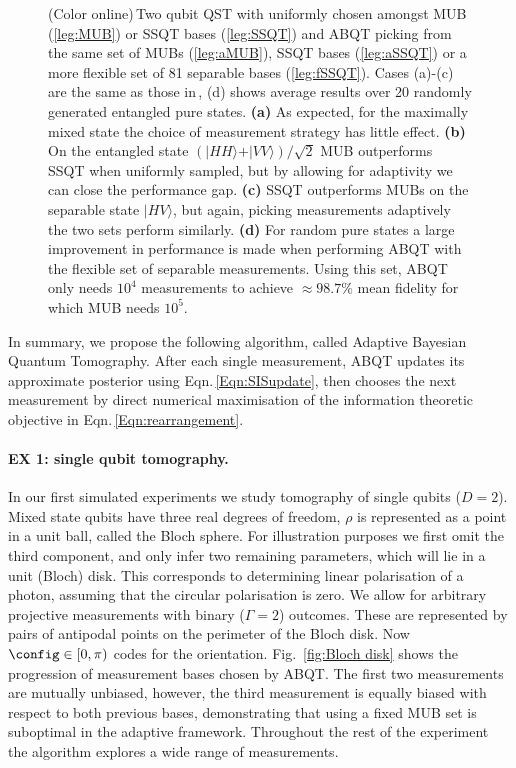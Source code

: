 \begin{figure*}[th]
\figthree
\caption{(Color online)\,Two qubit QST with uniformly chosen amongst MUB (\ref{leg:MUB}) or SSQT bases (\ref{leg:SSQT}) and ABQT picking from the same set of MUBs (\ref{leg:aMUB}),  SSQT bases (\ref{leg:aSSQT}) or a more flexible set of 81 separable bases (\ref{leg:fSSQT}). Cases (a)-(c) are the same as those in\,\citep{MUBExperiment}, (d) shows average results over 20 randomly generated entangled pure states. \textbf{(a)} As expected, for the maximally mixed state the choice of measurement strategy has little effect. \textbf{(b)} On the entangled state $(\vert HH\rangle+\vert VV\rangle)/\sqrt{2}$ MUB outperforms SSQT when uniformly sampled, but by allowing for adaptivity we can close the performance gap. \textbf{(c)} SSQT outperforms MUBs on the separable state $\vert HV \rangle$, but again, picking measurements adaptively the two sets perform similarly. \textbf{(d)} For random pure states a large improvement in performance is made when performing ABQT with the flexible set of separable measurements. Using this set, ABQT only needs $10^4$ measurements to achieve $\approx98.7\%$ mean fidelity for which MUB needs $10^5$.\label{fig:two_qubit_results}}
\end{figure*}

In summary, we propose the following algorithm, called Adaptive Bayesian Quantum Tomography. After each single measurement, ABQT updates its approximate posterior using Eqn.\,\eqref{Eqn:SISupdate}, then chooses the next measurement by direct numerical maximisation of the information theoretic objective in Eqn.\,\eqref{Eqn:rearrangement}.

\paragraph{EX 1: single qubit tomography.} In our first simulated experiments we study tomography of single qubits ($D=2$). Mixed state qubits have three real degrees of freedom, $\rho$ is represented as a point in a unit ball, called the Bloch sphere. For illustration purposes we first omit the third component, and only infer two remaining parameters, which will lie in a unit (Bloch) disk. This corresponds to \eg determining linear polarisation of a photon, assuming that the circular polarisation is zero. We allow for arbitrary projective measurements with binary ($\Gamma = 2$) outcomes. These are represented by pairs of antipodal points on the perimeter of the Bloch disk. Now $\config\in[0,\pi)$ codes for the orientation. Fig.\ \ref{fig:Bloch disk} shows the progression of measurement bases chosen by ABQT. The first two measurements are mutually unbiased, however, the third measurement is equally biased with respect to both previous bases, demonstrating that using a fixed MUB set is suboptimal in the adaptive framework. Throughout the rest of the experiment the algorithm explores a wide range of measurements.

